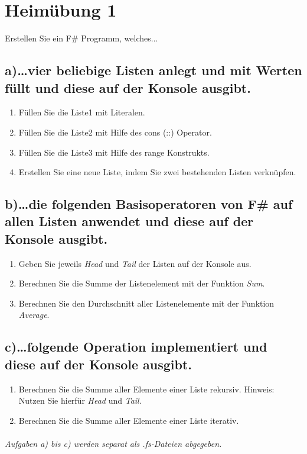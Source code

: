 \section{Heimübung 1}
Erstellen Sie ein F\# Programm, welches...
\subsection{a)\dots vier beliebige Listen anlegt und mit Werten füllt und diese auf der Konsole ausgibt.}
\begin{enumerate}
	\item Füllen Sie die Liste1 mit Literalen.
	\item Füllen Sie die Liste2 mit Hilfe des cons (::) Operator.
	\item Füllen Sie die Liste3 mit Hilfe des range Konstrukts.
	\item Erstellen Sie eine neue Liste, indem Sie zwei bestehenden Listen verknüpfen.
\end{enumerate}

\subsection{b)\dots die folgenden Basisoperatoren von F\# auf allen Listen anwendet und diese auf der Konsole ausgibt.}
\begin{enumerate}
	\item Geben Sie jeweils \textit{Head} und \textit{Tail} der Listen auf der Konsole aus.
	\item Berechnen Sie die Summe der Listenelement mit der Funktion \textit{Sum}.
	\item Berechnen Sie den Durchschnitt aller Listenelemente mit der Funktion	\textit{Average}.
\end{enumerate}

\subsection{c)\dots folgende Operation implementiert und diese auf der Konsole ausgibt.}
\begin{enumerate}
	\item Berechnen Sie die Summe aller Elemente einer Liste rekursiv. Hinweis: Nutzen Sie hierfür \textit{Head} und \textit{Tail}.
	\item Berechnen Sie die Summe aller Elemente einer Liste iterativ.
\end{enumerate}

\paragraph*{}\textit{Aufgaben a) bis c) werden separat als .fs-Dateien abgegeben.}
